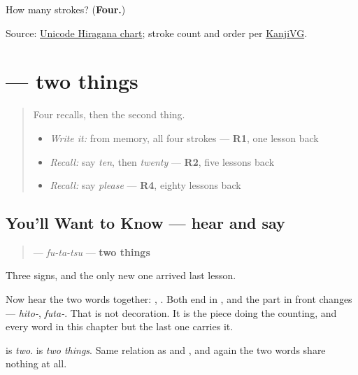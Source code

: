 \begin{tcolorbox}[breakable,colback=teal!4,colframe=teal!35!black,title={Before you move on}]
How many strokes? (\textbf{Four.})

Source: \href{https://www.unicode.org/charts/PDF/U3040.pdf}{Unicode Hiragana chart}; stroke count and order per \href{https://kanjivg.tagaini.net/kanjivg/kanji/03075.html}{KanjiVG}.
\end{tcolorbox}
\section[\texorpdfstring{\ja{ふたつ} (futatsu)}{ふたつ (futatsu)}]{ — two things}

\label{lesson:JA-C16-futatsu}



\begin{quote}
Four recalls, then the second thing.

\begin{itemize}
\raggedright
  \item \emph{Write it:} \textbf{} from memory, all four strokes — \textbf{R1}, one lesson back
  \item \emph{Recall:} say \emph{ten}, then \emph{twenty} — \textbf{R2}, five lessons back
  \item \emph{Recall:} say \emph{please} — \textbf{R4}, eighty lessons back
\end{itemize}
\end{quote}

\subsection*{You'll Want to Know — hear and say}
\begin{quote}
\textbf{} — \emph{fu-ta-tsu} — \textbf{two things}
\end{quote}

Three signs, and the only new one arrived last lesson.

Now hear the two words together: \textbf{}, \textbf{}. Both end in \textbf{}, and the part in front changes — \emph{hito-}, \emph{futa-}. That \textbf{} is not decoration. It is the piece doing the counting, and every word in this chapter but the last one carries it.

\textbf{} is \emph{two}. \textbf{} is \emph{two things}. Same relation as \textbf{} and \textbf{}, and again the two words share nothing at all.

